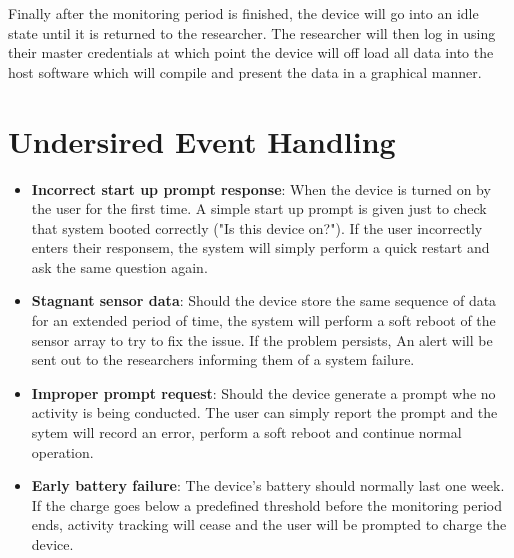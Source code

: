 \documentclass[12pt]{article}
\begin{document}
Finally after the monitoring period is finished, the device will go into an idle state until it is returned to the researcher. The researcher will then log in using their master credentials at which point the device will off load all data into the host software which will compile and present the data in a graphical manner.

\section{Undersired Event Handling}
\begin{itemize}
	\item \textbf{Incorrect start up prompt response}: When the device is turned on by the user for the first time. A simple start up prompt is given just to check that system booted correctly ("Is this device on?"). If the user incorrectly enters their responsem, the system will simply 				perform a quick restart and ask the same question again.

	\item \textbf{Stagnant sensor data}: Should the device store the same sequence of data for an extended period of time, the system will perform a soft reboot of the sensor array to try to fix the issue. If the problem persists, An alert will be sent out to the researchers informing them 			of a system failure.

	\item \textbf{Improper prompt request}: Should the device generate a prompt whe no activity is being conducted. The user can simply report the prompt and the sytem will record an error, perform a soft reboot and continue normal operation.

	\item \textbf{Early battery failure}: The device's battery should normally last one week. If the charge goes below a predefined threshold before the monitoring period ends, activity tracking will cease and the user will be prompted to charge the device.
\end{itemize}





\pagebreak
\end{document}
